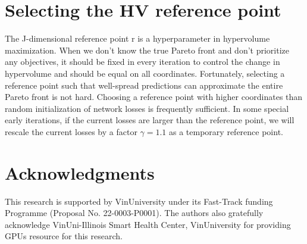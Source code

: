 \documentclass[letterpaper]{article} %
\begin{document}
\section{Selecting the HV reference point}
The J-dimensional reference point r is a hyperparameter in hypervolume maximization. When we don't know the true Pareto front and don't prioritize any objectives, it should be fixed in every iteration to control the change in hypervolume and should be equal on all coordinates. Fortunately, selecting a reference point such that well-spread predictions can approximate the entire Pareto front is not hard. Choosing a reference point with higher coordinates than random initialization of network losses is frequently sufficient. In some special early iterations, if the current losses are larger than the reference point, we will rescale the current losses by a factor $\gamma=1.1$ as a temporary reference point.

\section*{Acknowledgments}
This research is supported by VinUniversity under its Fast-Track funding Programme (Proposal No. 22-0003-P0001). The authors also gratefully acknowledge VinUni-Illinois Smart Health Center, VinUniversity for providing GPUs resource for this research.     




\end{document}
